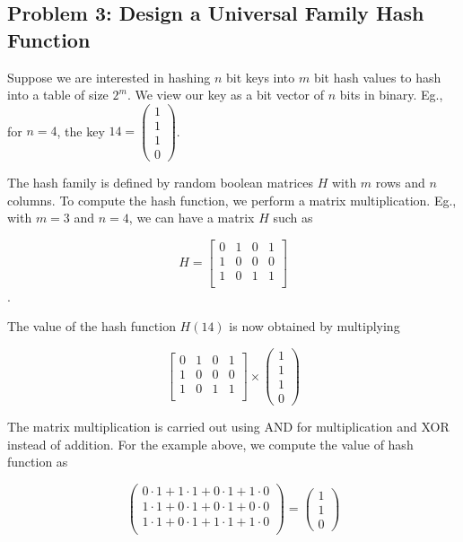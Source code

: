 \documentclass[
]{article}
\begin{document}
\hypertarget{problem-3-design-a-universal-family-hash-function}{%
\subsection{Problem 3: Design a Universal Family Hash
Function}\label{problem-3-design-a-universal-family-hash-function}}

Suppose we are interested in hashing \(n\) bit keys into \(m\) bit hash
values to hash into a table of size \(2^m\). We view our key as a bit
vector of \(n\) bits in binary. Eg., for \(n = 4\), the key
\(14 = \left(\begin{array}{c} 1\\ 1\\ 1\\ 0 \end{array} \right)\).

The hash family is defined by random boolean matrices \(H\) with \(m\)
rows and \(n\) columns. To compute the hash function, we perform a
matrix multiplication. Eg., with \(m = 3\) and \(n= 4\), we can have a
matrix \(H\) such as

\[ H = \left[ \begin{array}{cccc} 0 & 1 & 0 & 1 \\
1 & 0 & 0 & 0 \\
1 & 0 & 1 & 1 \\
\end{array} \right]\].

The value of the hash function \(H(14)\) is now obtained by multiplying

\[ \left[ \begin{array}{cccc} 0 & 1 & 0 & 1 \\
1 & 0 & 0 & 0 \\
1 & 0 & 1 & 1 \\
\end{array} \right] \times \left( \begin{array}{c}
1\\
1\\
1\\
0
\end{array} \right) \]

The matrix multiplication is carried out using AND for multiplication
and XOR instead of addition. For the example above, we compute the value
of hash function as

\[\left( \begin{array}{c}
 0 \cdot 1 + 1 \cdot 1 + 0 \cdot 1 + 1 \cdot 0 \\
 1 \cdot 1 + 0 \cdot 1 + 0 \cdot 1 + 0 \cdot 0 \\
 1 \cdot 1 + 0 \cdot 1 + 1 \cdot 1 + 1 \cdot 0 \\
 \end{array} \right) = \left( \begin{array}{c} 1 \\ 1 \\ 0 \end{array} \right)\]
\end{document}
